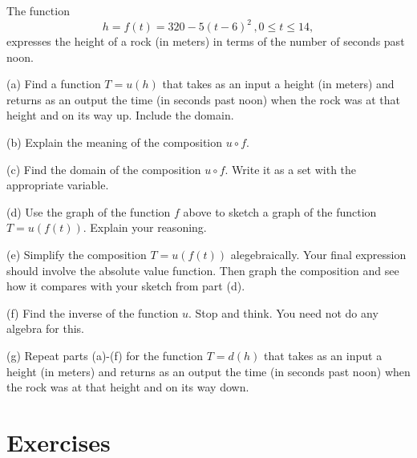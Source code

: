 \documentclass{ximera}
\begin{document}
\begin{example} \label{Ex8:Quadratics}
The function 
\[
   h = f(t) = 320 - 5 (t-6)^2 \, , 0\leq t \leq 14 ,
\]
expresses the height of a rock (in meters) in terms of the number of seconds past noon.

 
\begin{onlineOnly}
    \begin{center}
\end{center}
\end{onlineOnly}

(a) Find a function $T=u(h)$ that takes as an input a height (in meters) and returns as an output the time (in seconds past noon) when the rock was at that height and on its way up. Include the domain.

(b) Explain the meaning of the composition $u\circ f$.

(c) Find the domain of the composition $u\circ f$. Write it as a set with the appropriate variable.

(d) Use the graph of the function $f$ above to sketch a graph of the function $T= u(f(t))$. Explain your reasoning.

(e) Simplify the composition $T=u(f(t))$ alegebraically. Your final expression should involve the absolute value function. Then graph the composition and see how it compares with your sketch from part (d).  %

(f) Find the inverse of the function $u$. Stop and think. You need not do any algebra for this.

(g) Repeat parts (a)-(f) for the function $T=d(h)$ that takes as an input a height (in meters) and returns as an output the time (in seconds past noon) when the rock was at that height and on its way down.

\end{example}


\section*{Exercises}
\end{document}
